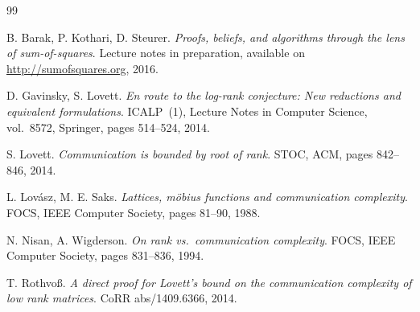 \documentclass{conjura-conjecture}
\begin{document}
\begin{conjurabibliography}{99}

B. Barak, P. Kothari, D. Steurer.
\emph{Proofs, beliefs, and algorithms through the lens of
sum-of-squares}.
Lecture notes in preparation, available on
\url{http://sumofsquares.org}, 2016.

D. Gavinsky, S. Lovett.
\emph{En route to the log-rank conjecture: New reductions and
equivalent formulations}.
ICALP~(1), Lecture Notes in Computer Science, vol.~8572, Springer,
pages 514--524, 2014.

S. Lovett.
\emph{Communication is bounded by root of rank}.
STOC, ACM, pages 842--846, 2014.

L. Lov\'{a}sz, M. E. Saks.
\emph{Lattices, m\"{o}bius functions and communication complexity}.
FOCS, IEEE Computer Society, pages 81--90, 1988.

N. Nisan, A. Wigderson.
\emph{On rank vs.\ communication complexity}.
FOCS, IEEE Computer Society, pages 831--836, 1994.

T. Rothvo{\ss}.
\emph{A direct proof for Lovett's bound on the communication
complexity of low rank matrices}.
CoRR abs/1409.6366, 2014.

\end{conjurabibliography}
\end{document}
